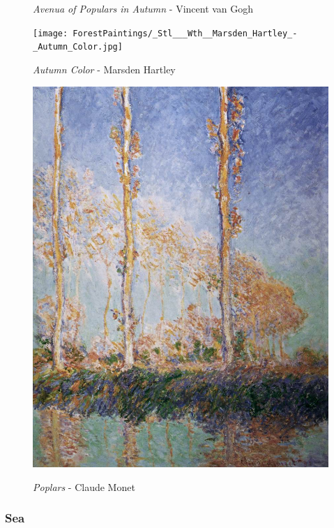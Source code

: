 \documentclass[a4paper]{article}
\begin{document}
\begin {figure}[h!]
\begin{minipage}[b]{.49\textwidth}
    \caption{\emph{Avenua of Populars in Autumn} - Vincent van Gogh}
\end{minipage}
\end{figure}

\begin {figure}[h!]
\centering
\begin{minipage}[b]{.49\textwidth}
	\centering
	\texttt{[image: ForestPaintings/\_Stl\_\_\_Wth\_\_Marsden\_Hartley\_-\_Autumn\_Color.jpg]}
    \caption{\emph{Autumn Color} - Marsden Hartley}
\end{minipage}
\hfill
\begin{minipage}[b]{.49\textwidth}
	\centering
	\includegraphics[width=\textwidth]{ForestPaintings/_Ext___Stl___Wth__Claude_Monet_-_Poplars.jpg}
    \caption{\emph{Poplars} - Claude Monet}
\end{minipage}
\end{figure}

\newpage
\subsubsection{Sea}
\end{document}
